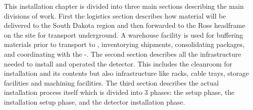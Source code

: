 This  installation chapter is divided into three main sections describing the main divisions of work. First the logistics section describes how material will be delivered to the South Dakota region and then forwarded to the Ross headframe on the  site for transport underground. A warehouse facility is used for buffering materials prior to transport to , inventorying shipments, consolidating packages, and coordinating with the  -. The second section describes all the infrastructure needed to install and operated the detector. This includes the cleanroom for installation and its contents but also infrastructure like racks, cable trays, storage facilities and machining facilities. The third section describes the actual installation process itself which is divided into 3 phases: the  setup phase, the installation setup phase, and the detector installation phase. 












%






%